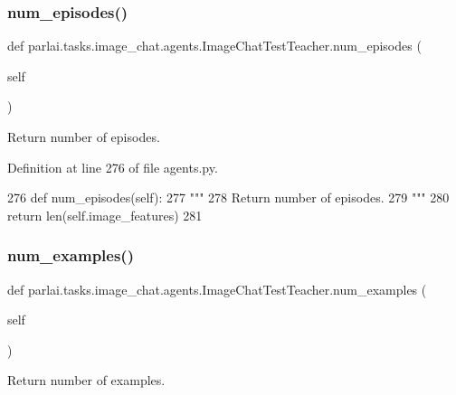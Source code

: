 \subsubsection{\texorpdfstring{num\+\_\+episodes()}{num\_episodes()}}
{\footnotesize\ttfamily def parlai.\+tasks.\+image\+\_\+chat.\+agents.\+Image\+Chat\+Test\+Teacher.\+num\+\_\+episodes (\begin{DoxyParamCaption}\item[{}]{self }\end{DoxyParamCaption})}

\begin{DoxyVerb}Return number of episodes.
\end{DoxyVerb}
 

Definition at line 276 of file agents.\+py.


\begin{DoxyCode}
276     \textcolor{keyword}{def }num\_episodes(self):
277         \textcolor{stringliteral}{"""}
278 \textcolor{stringliteral}{        Return number of episodes.}
279 \textcolor{stringliteral}{        """}
280         \textcolor{keywordflow}{return} len(self.image\_features)
281 
\end{DoxyCode}
\mbox{\label{classparlai_1_1tasks_1_1image__chat_1_1agents_1_1ImageChatTestTeacher_a5e5478cfc559bafed513c2421da53662}} 
\subsubsection{\texorpdfstring{num\+\_\+examples()}{num\_examples()}}
{\footnotesize\ttfamily def parlai.\+tasks.\+image\+\_\+chat.\+agents.\+Image\+Chat\+Test\+Teacher.\+num\+\_\+examples (\begin{DoxyParamCaption}\item[{}]{self }\end{DoxyParamCaption})}

\begin{DoxyVerb}Return number of examples.
\end{DoxyVerb}
 

